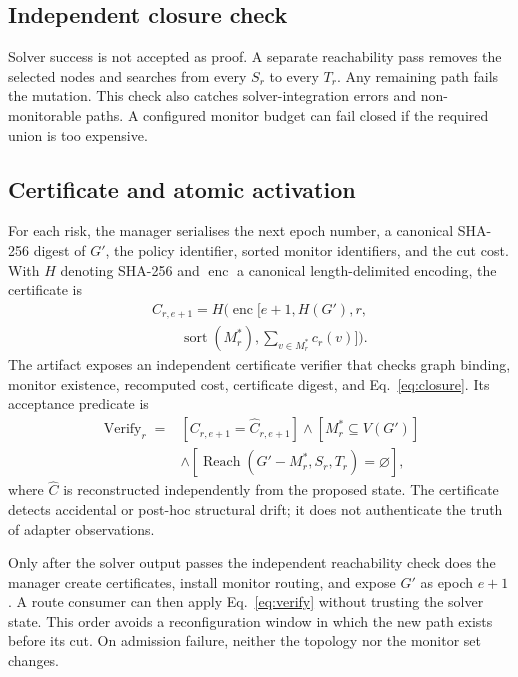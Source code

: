 \documentclass[10pt,journal,compsoc]{IEEEtran}
\begin{document}
\subsection{Independent closure check}

Solver success is not accepted as proof.  A separate reachability pass removes
the selected nodes and searches from every $S_r$ to every $T_r$.  Any remaining
path fails the mutation.  This check also catches solver-integration errors and
non-monitorable paths.  A configured monitor budget can fail closed if the
required union is too expensive.

\subsection{Certificate and atomic activation}

For each risk, the manager serialises the next epoch number, a canonical
SHA-256 digest of $G'$, the policy identifier, sorted monitor identifiers, and
the cut cost.  With $H$ denoting SHA-256 and $\operatorname{enc}$ a canonical
length-delimited encoding, the certificate is
\begin{equation}
\begin{split}
C_{r,e+1}=H\bigl(\operatorname{enc}[e+1,H(G'),r,\\[-2pt]
\qquad\operatorname{sort}(M_r^*),
\textstyle\sum_{v\in M_r^*}c_r(v)]\bigr).
\end{split}
\label{eq:certificate}
\end{equation}
The artifact exposes an independent certificate verifier that checks graph
binding, monitor existence, recomputed cost, certificate digest, and
Eq.~\eqref{eq:closure}.  Its acceptance predicate
is
\begin{equation}
\begin{split}
\operatorname{Verify}_r= {}& [C_{r,e+1}=\widehat C_{r,e+1}]
\wedge[M_r^*\subseteq V(G')] \\
&\wedge[\operatorname{Reach}(G'-M_r^*,S_r,T_r)=\varnothing],
\end{split}
\label{eq:verify}
\end{equation}
where $\widehat C$ is reconstructed independently from the proposed state.
The certificate detects accidental or post-hoc structural drift; it does not
authenticate the truth of adapter observations.

Only after the solver output passes the independent reachability check does the
manager create certificates, install monitor routing, and expose $G'$ as epoch
$e+1$.  A route consumer can then apply Eq.~\eqref{eq:verify} without trusting
the solver state.  This order avoids a reconfiguration window in which the new
path exists before its cut.  On admission failure, neither the topology nor the
monitor set changes.
\end{document}

